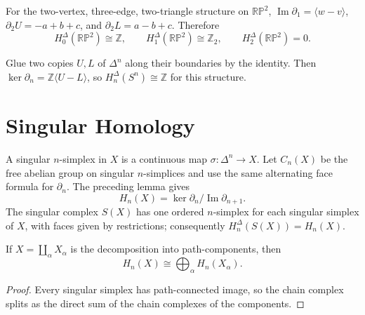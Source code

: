 \begin{example}
\label{ex:simplicial-homology-rp2}

For the two-vertex, three-edge, two-triangle structure on $\mathbb{RP}^2$, $\operatorname{Im}\partial_1=\langle w-v\rangle$, $\partial_2U=-a+b+c$, and $\partial_2L=a-b+c$.  Therefore
\[
H_0^\Delta(\mathbb{RP}^2)\cong\mathbb{Z},\qquad H_1^\Delta(\mathbb{RP}^2)\cong\mathbb{Z}_2,\qquad H_2^\Delta(\mathbb{RP}^2)=0.
\]
\end{example}

\begin{example}
\label{ex:delta-complex-sn}

Glue two copies $U,L$ of $\Delta^n$ along their boundaries by the identity.  Then $\ker\partial_n=\mathbb{Z}\langle U-L\rangle$, so $H_n^\Delta(S^n)\cong\mathbb{Z}$ for this structure.
\end{example}

\section*{Singular Homology}

A singular $n$-simplex in $X$ is a continuous map $\sigma:\Delta^n\to X$.  Let $C_n(X)$ be the free abelian group on singular $n$-simplices and use the same alternating face formula for $\partial_n$.  The preceding lemma gives
\[
H_n(X)=\ker\partial_n/\operatorname{Im}\partial_{n+1}.
\]
The singular complex $S(X)$ has one ordered $n$-simplex for each singular simplex of $X$, with faces given by restrictions; consequently $H_n^\Delta(S(X))=H_n(X)$.

\begin{proposition}
\label{prop:homology-disjoint-union}

If $X=\coprod_\alpha X_\alpha$ is the decomposition into path-components, then
\[
H_n(X)\cong\bigoplus_\alpha H_n(X_\alpha).
\]
\end{proposition}
\begin{proof}
\sketch Every singular simplex has path-connected image, so the chain complex splits as the direct sum of the chain complexes of the components.
\end{proof}

